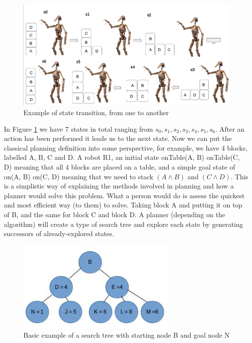 \begin{figure}[!htb]
    \centering
    \includegraphics[scale=0.3]{StateTransitionEdit.png}
    \caption{Example of state transition, from one to another}
    \label{fig:StateTransition}
\end{figure}
In Figure \ref{fig:StateTransition} we have 7 states in total ranging from $s_0, s_1, s_2, s_3, s_4, s_5, s_6$. After an action has been performed it leads us to the next state. Now we can put the classical planning definition into some perspective, for example, we have 4 blocks, labelled A, B, C and D. A robot R1, an initial state onTable(A, B) onTable(C, D) meaning that all 4 blocks are placed on a table, and a simple goal state of on(A, B) on(C, D) meaning that we need to stack $(A\wedge B)$ and $(C\wedge D)$. This is a simplistic way of explaining the methods involved in planning and how a planner would solve this problem. What a person would do is assess the quickest and most efficient way (to them) to solve. Taking block A and putting it on top of B, and the same for block C and block D. A planner (depending on the algorithm) will create a type of search tree and explore each state by generating successors of already-explored states.
\begin{figure}[!htb]
    \centering
    \includegraphics[scale=2.0,width=0.70\textwidth]{TreeExample.jpg}
    \caption{Basic example of a search tree with starting node B and goal node N\cite{PlanningBook}}
    \label{fig:Tree Example}
\end{figure}

